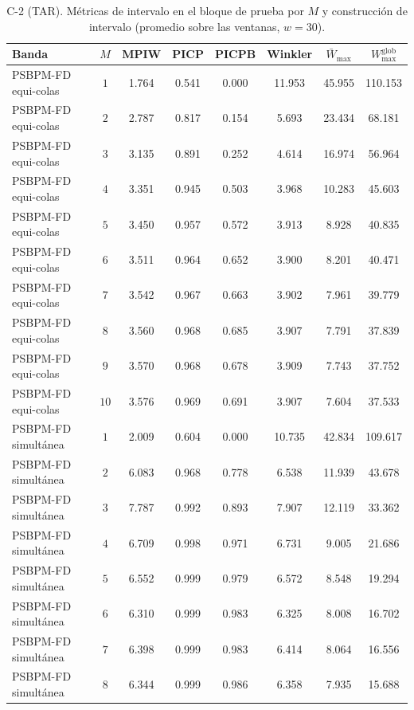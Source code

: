 \begin{table}[H]
\centering\footnotesize
\caption{C-2 (TAR). Métricas de intervalo en el bloque de prueba por $M$ y construcción de intervalo (promedio sobre las ventanas, $w = 30$).}
\label{tab:aneB_B_C2}
\begin{tabular}{l c cccccc}
\hline
 Banda & $M$ & MPIW & PICP & PICPB & Winkler & $\bar{W}_{\max}$ & $W_{\max}^{\mathrm{glob}}$ \\
\hline
PSBPM-FD equi-colas & $1$ & 1.764 & 0.541 & 0.000 & 11.953 & 45.955 & 110.153 \\
PSBPM-FD equi-colas & $2$ & 2.787 & 0.817 & 0.154 & 5.693 & 23.434 & 68.181 \\
PSBPM-FD equi-colas & $3$ & 3.135 & 0.891 & 0.252 & 4.614 & 16.974 & 56.964 \\
PSBPM-FD equi-colas & $4$ & 3.351 & 0.945 & 0.503 & 3.968 & 10.283 & 45.603 \\
PSBPM-FD equi-colas & $5$ & 3.450 & 0.957 & 0.572 & 3.913 & 8.928 & 40.835 \\
PSBPM-FD equi-colas & $6$ & 3.511 & 0.964 & 0.652 & 3.900 & 8.201 & 40.471 \\
PSBPM-FD equi-colas & $7$ & 3.542 & 0.967 & 0.663 & 3.902 & 7.961 & 39.779 \\
PSBPM-FD equi-colas & $8$ & 3.560 & 0.968 & 0.685 & 3.907 & 7.791 & 37.839 \\
PSBPM-FD equi-colas & $9$ & 3.570 & 0.968 & 0.678 & 3.909 & 7.743 & 37.752 \\
PSBPM-FD equi-colas & $10$ & 3.576 & 0.969 & 0.691 & 3.907 & 7.604 & 37.533 \\
\hline
PSBPM-FD simultánea & $1$ & 2.009 & 0.604 & 0.000 & 10.735 & 42.834 & 109.617 \\
PSBPM-FD simultánea & $2$ & 6.083 & 0.968 & 0.778 & 6.538 & 11.939 & 43.678 \\
PSBPM-FD simultánea & $3$ & 7.787 & 0.992 & 0.893 & 7.907 & 12.119 & 33.362 \\
PSBPM-FD simultánea & $4$ & 6.709 & 0.998 & 0.971 & 6.731 & 9.005 & 21.686 \\
PSBPM-FD simultánea & $5$ & 6.552 & 0.999 & 0.979 & 6.572 & 8.548 & 19.294 \\
PSBPM-FD simultánea & $6$ & 6.310 & 0.999 & 0.983 & 6.325 & 8.008 & 16.702 \\
PSBPM-FD simultánea & $7$ & 6.398 & 0.999 & 0.983 & 6.414 & 8.064 & 16.556 \\
PSBPM-FD simultánea & $8$ & 6.344 & 0.999 & 0.986 & 6.358 & 7.935 & 15.688 \\

\end{tabular}
\end{table}
